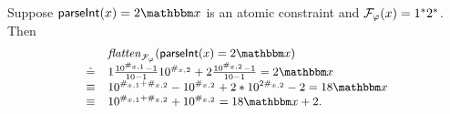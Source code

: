 \begin{example}
Suppose $\parseInt(\svarx) = 2\ivarx$ is an atomic constraint and $\mathcal{F}_\varphi(x) = 1^*2^*$. Then 
\[
\small
\begin{array}{l l}
& \flatten_{\flatfun_\varphi}(\parseInt(\svarx)  =  2\ivarx)  \\
\Def & 1 \frac{10^{\#_{\svarx,1}}-1}{10-1}10^{\#_{\svarx,2}}  + 2 \frac{10^{\#_{\svarx,2}}-1}{10-1} = 2\ivarx   \\
\equiv & 10^{\#_{\svarx,1}+\#_{\svarx,2}} - 10^{\#_{\svarx,2}}  + 2*10^{2\#_{\svarx,2}}- 2 = 18\ivarx \\
\equiv & 10^{\#_{\svarx,1}+\#_{\svarx,2}} +  10^{\#_{\svarx,2}} = 18\ivarx + 2.
\end{array}
\]
\end{example}



